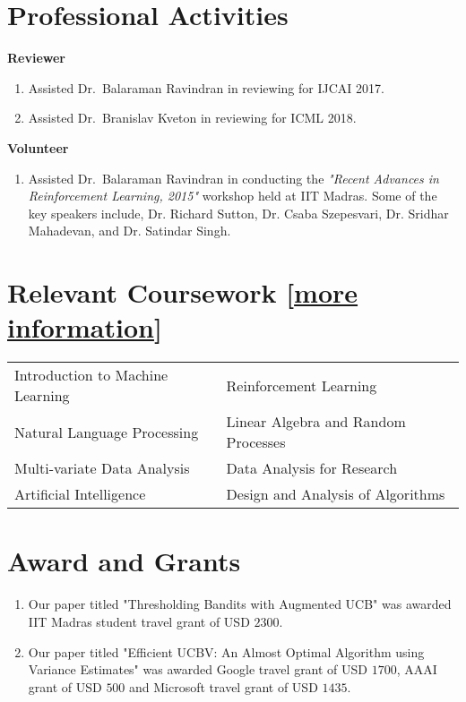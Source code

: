 \documentclass[margin,11pt]{res}
\begin{document}
\begin{resume}
\section{Professional Activities}
\textbf{Reviewer} 
\begin{enumerate}
\item Assisted Dr.~Balaraman Ravindran in reviewing for IJCAI 2017.
\item Assisted Dr.~Branislav Kveton in reviewing for ICML 2018.
\end{enumerate}

\textbf{Volunteer} 
\begin{enumerate}
\item Assisted Dr.~Balaraman Ravindran in conducting the \textit{"Recent Advances in Reinforcement Learning, 2015"} workshop held at IIT Madras. Some of the key speakers include, Dr. Richard Sutton, Dr. Csaba Szepesvari, Dr. Sridhar Mahadevan, and Dr. Satindar Singh.
\end{enumerate}


\section{Relevant Coursework [\href{https://github.com/Subhojyoti/subhojyoti.github.io/blob/master/pdf/Courses\%20Information.pdf}{more information}]}
\begin{tabular}{ll}
Introduction to Machine Learning & Reinforcement Learning  \\
Natural Language Processing & Linear Algebra and Random Processes \\
Multi-variate Data Analysis & Data Analysis for Research \\
Artificial Intelligence & Design and Analysis of Algorithms \\
\end{tabular}

\section{Award and Grants}
\begin{enumerate}
\item Our paper titled "Thresholding Bandits with Augmented UCB" was awarded IIT Madras student travel grant of USD $2300$.
\item Our paper titled "Efficient UCBV: An Almost Optimal Algorithm using Variance Estimates" was awarded Google travel grant of USD $1700$, AAAI grant of USD $500$ and Microsoft travel grant of USD $1435$.
\end{enumerate}



\end{resume}
\end{document}
